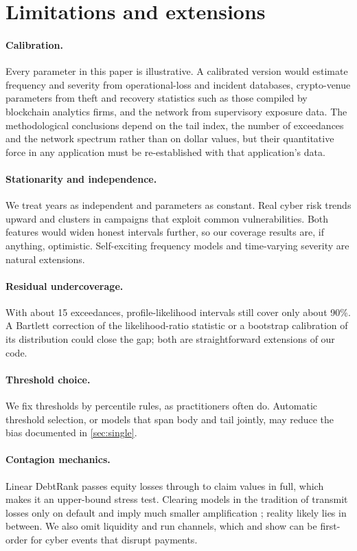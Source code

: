 \section{Limitations and extensions}\label{sec:limits}

\paragraph{Calibration.} Every parameter in this paper is illustrative. A calibrated version would estimate frequency and severity from operational-loss and incident databases, crypto-venue parameters from theft and recovery statistics such as those compiled by blockchain analytics firms, and the network from supervisory exposure data. The methodological conclusions depend on the tail index, the number of exceedances and the network spectrum rather than on dollar values, but their quantitative force in any application must be re-established with that application's data.

\paragraph{Stationarity and independence.} We treat years as independent and parameters as constant. Real cyber risk trends upward and clusters in campaigns that exploit common vulnerabilities. Both features would widen honest intervals further, so our coverage results are, if anything, optimistic. Self-exciting frequency models and time-varying severity are natural extensions.

\paragraph{Residual undercoverage.} With about 15 exceedances, profile-likelihood intervals still cover only about 90\%. A Bartlett correction of the likelihood-ratio statistic \citep{bartlett1937} or a bootstrap calibration of its distribution could close the gap; both are straightforward extensions of our code.

\paragraph{Threshold choice.} We fix thresholds by percentile rules, as practitioners often do. Automatic threshold selection, or models that span body and tail jointly, may reduce the bias documented in \cref{sec:single}.

\paragraph{Contagion mechanics.} Linear DebtRank passes equity losses through to claim values in full, which makes it an upper-bound stress test. Clearing models in the tradition of \citet{eisenberg2001} transmit losses only on default and imply much smaller amplification \citep{glasserman2015}; reality likely lies in between. We also omit liquidity and run channels, which \citet{duffie2019} and \citet{eisenbach2022} show can be first-order for cyber events that disrupt payments.

